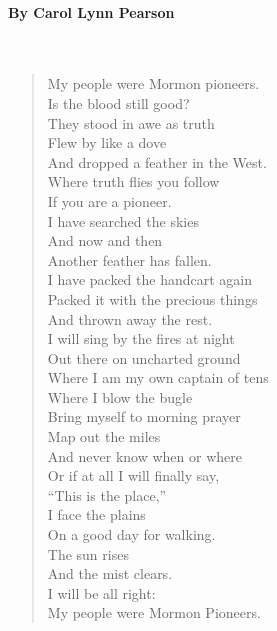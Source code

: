 \documentclass[12pt, openany, letterpaper]{memoir}
\begin{document}
\paragraph{By Carol Lynn Pearson}~
\begin{verse}
	My people were Mormon pioneers.\\	
	Is the blood still good?\\	
	They stood in awe as truth\\
	Flew by like a dove\\
	And dropped a feather in the West.\\
	Where truth flies you follow\\	
	If you are a pioneer.\\
	I have searched the skies\\
	And now and then\\
	Another feather has fallen.\\
	I have packed the handcart again\\	
	Packed it with the precious things\\
	And thrown away the rest.\\
	I will sing by the fires at night\\	
	Out there on uncharted ground\\
	Where I am my own captain of tens\\	
	Where I blow the bugle\\
	Bring myself to morning prayer\\
	Map out the miles\\
	And never know when or where\\
	Or if at all I will finally say,\\
	“This is the place,”\\
	I face the plains\\
	On a good day for walking.\\
	The sun rises\\
	And the mist clears.\\
	I will be all right:\\
	My people were Mormon Pioneers.
\end{verse}
\end{document}
